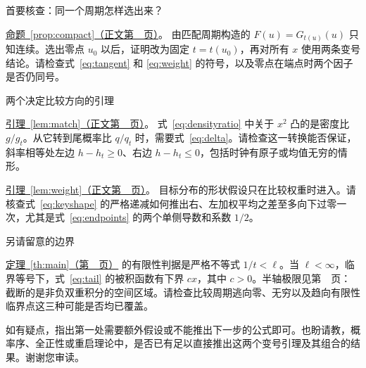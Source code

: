 \documentclass[11pt]{article}
\begin{document}
{\large 首要核查：同一个周期怎样选出来？}\par
\hyperref[prop:compact]{命题~\ref{prop:compact}（正文第~\pageref{prop:compact}~页）}。
由匹配周期构造的 \(F(u)=G_{t(u)}(u)\) 只知连续。选出零点 \(u_0\) 以后，证明改为固定 \(t=t(u_0)\)，再对所有 \(x\) 使用两条变号结论。请检查式~\eqref{eq:tangent} 和 \eqref{eq:weight} 的符号，以及零点在端点时两个因子是否仍同号。

{\large 两个决定比较方向的引理}\par
\hyperref[lem:match]{引理~\ref{lem:match}（正文第~\pageref{lem:match}~页）}。
式~\eqref{eq:densityratio} 中关于 \(x^2\) 凸的是密度比 \(g/g_t\)。从它转到尾概率比 \(q/q_t\) 时，需要式~\eqref{eq:delta}。请检查这一转换能否保证，斜率相等处左边 \(h-h_t\ge0\)、右边 \(h-h_t\le0\)，包括时钟有原子或均值无穷的情形。

\hyperref[lem:weight]{引理~\ref{lem:weight}（正文第~\pageref{lem:weight}~页）}。
目标分布的形状假设只在比较权重时进入。请核查式~\eqref{eq:keyshape} 的严格递减如何推出右、左加权平均之差至多向下过零一次，尤其是式~\eqref{eq:endpoints} 的两个单侧导数和系数 \(1/2\)。

{\large 另请留意的边界}\par
\hyperref[th:main]{定理~\ref{th:main}（第~\pageref{th:main}~页）} 的有限性判据是严格不等式 \(1/t<\ell\)。当 \(\ell<\infty\)，临界等号下，式~\eqref{eq:tail} 的被积函数有下界 \(c x\)，其中 \(c>0\)。半轴极限见第~\pageref{sec:attain}~页：截断的是非负双重积分的空间区域。请检查比较周期逃向零、无穷以及趋向有限性临界点这三种可能是否均已覆盖。

如有疑点，指出第一处需要额外假设或不能推出下一步的公式即可。也盼请教，概率序、全正性或重启理论中，是否已有足以直接推出这两个变号引理及其组合的结果。谢谢您审读。
\endgroup
\end{document}
